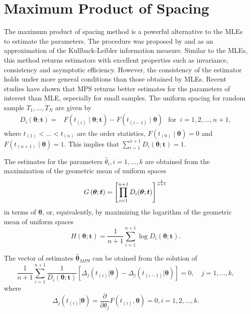 \documentclass[10pt,a4paper,onecolumn]{article} %
\begin{document}
\section{Maximum Product of Spacing}


The maximum product of spacing method is a powerful alternative to the MLEs to estimate the parameters. The procedure was proposed by \cite{cheng1983estimating} and \cite{ranneby} as an approximation of the Kullback-Leibler information measure. Similar to the MLEs, this method returns estimators with excellent properties such as invariance, consistency and asymptotic efficiency. However, the consistency of the estimator holds under more general conditions than those obtained by MLEs. Recent studies have shown that MPS returns better estimates for the parameters of interest than MLE, especially for small samples.  The uniform spacing for random sample $T_1,\ldots,T_N$ are given by
\begin{equation}
\begin{aligned}
D_{i}(\boldsymbol{\theta};\boldsymbol{t})=&F\left( t_{(i)}\mid\boldsymbol{\theta};\boldsymbol{t}\right)
-F\left( t_{(i-1)}\mid \boldsymbol{\theta} \right) \ \ \mbox{ for } \  i=1,2,\ldots ,n+1,
\end{aligned}
\end{equation}
where $t_{(1)}<  \ldots < t_{(n)}$ are the order statistics, $F(t_{(0)}\mid \boldsymbol{\theta})=0$ and $F( t_{(n+1)}\mid
\boldsymbol{\theta})=1.$ This implies that 
$\sum_{i=1}^{n+1} D_i (\boldsymbol{\theta};\boldsymbol{t}) =1$. 

The estimates for the parameters  $\hat{\theta}_i, i=1,\ldots,k$ are obtained from the maximization of the geometric mean of uniform spaces
\begin{equation}\label{mpsmean1}
G\left( \boldsymbol{\theta};\boldsymbol{t}\right) =\left[ \prod\limits_{i=1}^{n+1}D_{i}( \boldsymbol{\theta};\boldsymbol{t})\right] ^{%
\frac{1}{n+1}}
\end{equation}%
in terms of $\boldsymbol{\theta}$, or, equivalently, by maximizing the logarithm of the geometric mean of uniform spaces
\begin{equation}
H\left( \boldsymbol{\theta};\boldsymbol{t}\right) =\frac{1}{n+1}\sum_{i=1}^{n+1}\log
D_{i} ( \boldsymbol{\theta};\boldsymbol{t}).
\end{equation}

The vector of estimates $\hat{\boldsymbol{\theta}}_{MPS}$ can be otained from the solution of
\begin{equation}
\frac{1}{n+1}%
\sum\limits_{i=1}^{n+1}\frac{1}{D_{i}(\boldsymbol{\theta};\boldsymbol{t})} \left[ \Delta_j
(t_{(i)} |  \boldsymbol{\theta}) - \Delta_j (t_{(i-1)} |  \boldsymbol{\theta})
\right] =0, \quad j=1,\ldots,k,
\end{equation}
where
\begin{equation}\label{dervermps} \Delta_j(t_{(i)} |  \boldsymbol{\theta})= \frac{\partial}{\partial \theta_j}F(t_{(i)},\boldsymbol{\theta})=0 , i=1,2,\ldots,k.   \end{equation}
\end{document}

